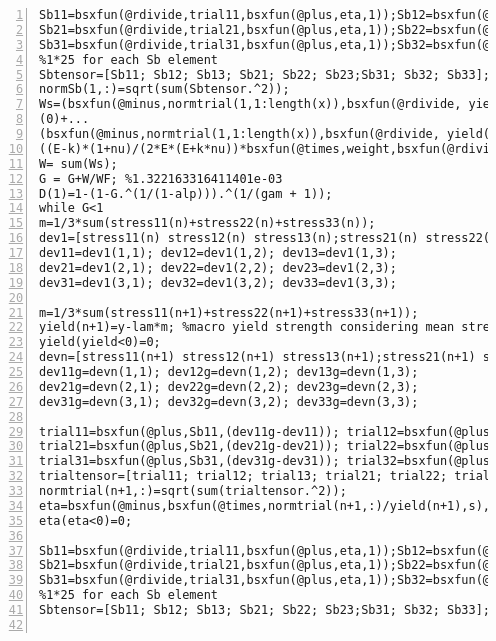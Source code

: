 \begin{lstlisting}[numbers=left, numberstyle=\tiny, keywordstyle=\color{blue!100}, commentstyle=\color{red!30!green!100!blue!100}, frame=shadowbox, rulesepcolor=\color{red!20!green!20!blue!20}]
Sb11=bsxfun(@rdivide,trial11,bsxfun(@plus,eta,1));Sb12=bsxfun(@rdivide,trial12,bsxfun(@plus,eta,1));Sb13=bsxfun(@rdivide,trial13,bsxfun(@plus,eta,1));
Sb21=bsxfun(@rdivide,trial21,bsxfun(@plus,eta,1));Sb22=bsxfun(@rdivide,trial22,bsxfun(@plus,eta,1));Sb23=bsxfun(@rdivide,trial23,bsxfun(@plus,eta,1));
Sb31=bsxfun(@rdivide,trial31,bsxfun(@plus,eta,1));Sb32=bsxfun(@rdivide,trial32,bsxfun(@plus,eta,1));Sb33=bsxfun(@rdivide,trial33,bsxfun(@plus,eta,1));
%1*25 for each Sb element
Sbtensor=[Sb11; Sb12; Sb13; Sb21; Sb22; Sb23;Sb31; Sb32; Sb33];
normSb(1,:)=sqrt(sum(Sbtensor.^2));
Ws=(bsxfun(@minus,normtrial(1,1:length(x)),bsxfun(@rdivide, yield(1),s))<=0).*...
(0)+...
(bsxfun(@minus,normtrial(1,1:length(x)),bsxfun(@rdivide, yield(1),s))>0).*...
((E-k)*(1+nu)/(2*E*(E+k*nu))*bsxfun(@times,weight,bsxfun(@rdivide,bsxfun(@times,bsxfun(@minus,normtrial(1,1:length(x)),bsxfun(@rdivide, yield(1),s)),yield(1)),s)));
W= sum(Ws);
G = G+W/WF; %1.322163316411401e-03
D(1)=1-(1-G.^(1/(1-alp))).^(1/(gam + 1));
while G<1
m=1/3*sum(stress11(n)+stress22(n)+stress33(n));
dev1=[stress11(n) stress12(n) stress13(n);stress21(n) stress22(n) stress23(n);stress31(n) stress32(n) stress33(n)]-m*eye(3);
dev11=dev1(1,1); dev12=dev1(1,2); dev13=dev1(1,3);
dev21=dev1(2,1); dev22=dev1(2,2); dev23=dev1(2,3);
dev31=dev1(3,1); dev32=dev1(3,2); dev33=dev1(3,3);

m=1/3*sum(stress11(n+1)+stress22(n+1)+stress33(n+1));
yield(n+1)=y-lam*m; %macro yield strength considering mean stress effect
yield(yield<0)=0;
devn=[stress11(n+1) stress12(n+1) stress13(n+1);stress21(n+1) stress22(n+1) stress23(n+1);stress31(n+1) stress32(n+1) stress33(n+1)]-m*eye(3);
dev11g=devn(1,1); dev12g=devn(1,2); dev13g=devn(1,3);
dev21g=devn(2,1); dev22g=devn(2,2); dev23g=devn(2,3);
dev31g=devn(3,1); dev32g=devn(3,2); dev33g=devn(3,3);

trial11=bsxfun(@plus,Sb11,(dev11g-dev11)); trial12=bsxfun(@plus,Sb12,(dev12g-dev12));trial13=bsxfun(@plus,Sb13,(dev13g-dev13));
trial21=bsxfun(@plus,Sb21,(dev21g-dev21)); trial22=bsxfun(@plus,Sb22,(dev22g-dev22));trial23=bsxfun(@plus,Sb23,(dev23g-dev23));
trial31=bsxfun(@plus,Sb31,(dev31g-dev31)); trial32=bsxfun(@plus,Sb32,(dev32g-dev32));trial33=bsxfun(@plus,Sb33,(dev33g-dev33));
trialtensor=[trial11; trial12; trial13; trial21; trial22; trial23;trial31; trial32; trial33];
normtrial(n+1,:)=sqrt(sum(trialtensor.^2));
eta=bsxfun(@minus,bsxfun(@times,normtrial(n+1,:)/yield(n+1),s),1); %1*25
eta(eta<0)=0;

Sb11=bsxfun(@rdivide,trial11,bsxfun(@plus,eta,1));Sb12=bsxfun(@rdivide,trial12,bsxfun(@plus,eta,1));Sb13=bsxfun(@rdivide,trial13,bsxfun(@plus,eta,1));
Sb21=bsxfun(@rdivide,trial21,bsxfun(@plus,eta,1));Sb22=bsxfun(@rdivide,trial22,bsxfun(@plus,eta,1));Sb23=bsxfun(@rdivide,trial23,bsxfun(@plus,eta,1));
Sb31=bsxfun(@rdivide,trial31,bsxfun(@plus,eta,1));Sb32=bsxfun(@rdivide,trial32,bsxfun(@plus,eta,1));Sb33=bsxfun(@rdivide,trial33,bsxfun(@plus,eta,1));
%1*25 for each Sb element
Sbtensor=[Sb11; Sb12; Sb13; Sb21; Sb22; Sb23;Sb31; Sb32; Sb33];


\end{lstlisting}
